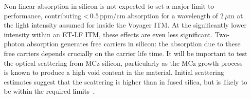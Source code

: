 Non-linear absorption in silicon is not expected to set a major limit to performance, contributing <\,0.5\,ppm/cm absorption for a wavelength of 2\,$\mu$m at the light intensity assumed for inside the Voyager ITM. At the significantly lower intensity within an ET-LF ITM, these effects are even less significant. 
Two-photon absorption generates free carriers in silicon: the absorption due to these free carriers depends crucially on the carrier life time. 
It will be important to test the optical scattering from MCz silicon, particularly as the MCz growth process is known to produce a high void content in the material. 
Initial scattering estimates
suggest that the scattering is higher than in fused silica, but is likely to be within the required limits~\cite{SiliconScatter2017}.

